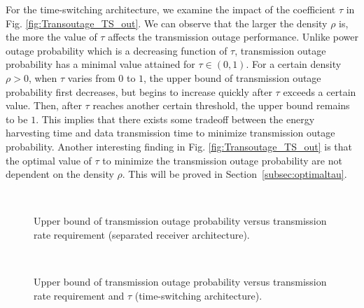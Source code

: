 \documentclass[12pt,draftclsnofoot,onecolumn]{IEEEtran}
\begin{document}
For the time-switching architecture, we examine the impact of the coefficient $\tau$ in Fig. \ref{fig:Transoutage_TS_out}. We can observe that the larger the density $\rho$ is, the more the value of $\tau$ affects the transmission outage performance. Unlike power outage probability which is a decreasing function of $\tau$, transmission outage probability has a minimal value attained for $\tau\in(0,1)$. For a certain density $\rho>0$, when $\tau$ varies from $0$ to $1$, the upper bound of transmission outage probability first decreases, but begins to increase quickly after $\tau$ exceeds a certain value. Then, after $\tau$ reaches another certain threshold, the upper bound remains to be $1$. This implies that there exists some tradeoff between the energy harvesting time and data transmission time to minimize transmission outage probability. Another interesting finding in Fig. \ref{fig:Transoutage_TS_out} is that the optimal value of $\tau$ to minimize the transmission outage probability are not dependent on the density $\rho$. This will be proved in Section~\ref{subsec:optimaltau}.

\begin{figure} 
\centering
{} 
\centering
{} \\
\centering
\caption{Upper bound of transmission outage probability versus transmission rate requirement (separated receiver architecture).}
\label{fig:transoutage_rate}
\end{figure}  
    

\begin{figure} 
\centering
{} 
\centering
{} \\
\centering
\caption{Upper bound of transmission outage probability versus transmission rate requirement and $\tau$ (time-switching architecture).}
\label{fig:trans_outage_alpha}
\end{figure}
    
\end{document}
